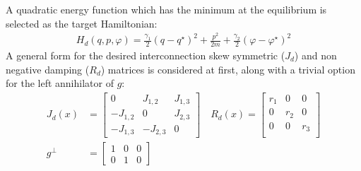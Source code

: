 \documentclass[letterpaper, 10pt, conference]{ieeeconf}
\begin{document}
A quadratic energy function which has the minimum at the equilibrium is selected as the target Hamiltonian:
\begin{align}
    H_d(q,p,\varphi) = \frac{\gamma_1}{2} (q-q^\star)^2 + \frac{p^2}{2m} + \frac{\gamma_2}{2}(\varphi-\varphi^\star)^2
    \label{eq:Hd}
\end{align}
A general form for the desired interconnection skew symmetric ($J_d$) and non negative damping ($R_d$) matrices is considered at first, along with a trivial option for the left annihilator of $g$:
\begin{equation}
    \begin{aligned}
    J_{d}(x) &= \begin{bmatrix}
        0 & J_{1,2} & J_{1,3}\\
        -J_{1,2} & 0 & J_{2,3}\\
        -J_{1,3} & -J_{2,3} & 0
    \end{bmatrix} \quad R_{d}(x) = \begin{bmatrix}
        r_{1} & 0 & 0\\
        0 & r_{2} & 0\\
        0 & 0 & r_{3}\\
    \end{bmatrix} \\
    g^\perp &= \begin{bmatrix}
        1 & 0 & 0\\ 
        0 & 1 & 0
    \end{bmatrix}
\end{aligned}\label{eq:JRd}
\end{equation}
\end{document}
